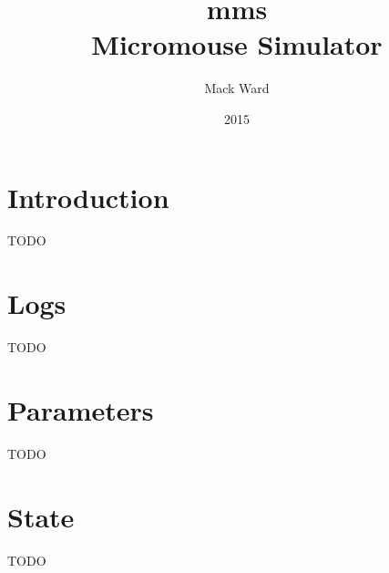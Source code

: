 \documentclass[12pt]{article}
\begin{document}
\renewcommand{\l}{\left(}
\renewcommand{\r}{\right)}

\title{\vspace{60mm}\textbf{mms}\\Micromouse Simulator}
\author{Mack Ward}
\date{2015}
\maketitle

\newpage
\renewcommand*\contentsname{Table of Contents}
\tableofcontents

\newpage
\section{Introduction}
TODO

\section{Logs}
TODO

\section{Parameters}
TODO

\section{State}
TODO
\end{document}
